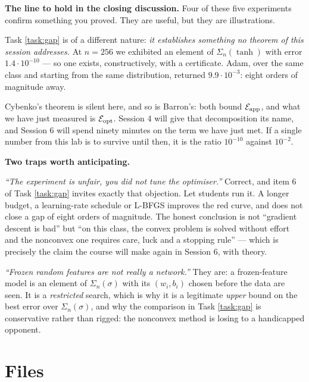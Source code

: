 \documentclass[11pt,a4paper]{article}
\begin{document}
\medskip

\begin{warnbox}
\textbf{The line to hold in the closing discussion.} Four of these five experiments confirm
something you proved. They are useful, but they are illustrations.

\smallskip
Task \ref{task:gap} is of a different nature: \emph{it establishes something no theorem of this
session addresses.} At $n = 256$ we exhibited an element of $\Sigma_n(\tanh)$ with error
$1.4\cdot10^{-10}$ --- so one exists, constructively, with a certificate. Adam, over the same class
and starting from the same distribution, returned $9.9\cdot10^{-3}$: eight orders of magnitude away.

\smallskip
Cybenko's theorem is silent here, and so is Barron's: both bound $\mathcal{E}_{\mathrm{app}}$, and what we
have just measured is $\mathcal{E}_{\mathrm{opt}}$. Session 4 will give that decomposition its name, and
Session 6 will spend ninety minutes on the term we have just met. If a single number from this lab
is to survive until then, it is the ratio $10^{-10}$ against $10^{-2}$.
\end{warnbox}

\medskip
\noindent
\textbf{Two traps worth anticipating.}

\smallskip\noindent
\emph{``The experiment is unfair, you did not tune the optimiser.''} Correct, and item 6 of Task
\ref{task:gap} invites exactly that objection. Let students run it. A longer budget, a learning-rate
schedule or L-BFGS improves the red curve, and does not close a gap of eight orders of magnitude.
The honest conclusion is not ``gradient descent is bad'' but ``on this class, the convex problem is
solved without effort and the nonconvex one requires care, luck and a stopping rule'' --- which is
precisely the claim the course will make again in Session 6, with theory.

\smallskip\noindent
\emph{``Frozen random features are not really a network.''} They are: a frozen-feature model is an
element of $\Sigma_n(\sigma)$ with its $(w_i,b_i)$ chosen before the data are seen. It is a
\emph{restricted} search, which is why it is a legitimate \emph{upper} bound on the best error over
$\Sigma_n(\sigma)$, and why the comparison in Task \ref{task:gap} is conservative rather than rigged:
the nonconvex method is losing to a handicapped opponent.

\fi

\section*{Files}
\end{document}
